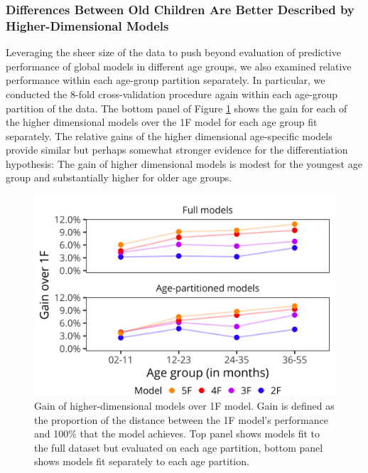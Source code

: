 \documentclass[man, floatsintext]{apa7}
\begin{document}
\subsubsection{Differences Between Old Children Are Better Described by
Higher-Dimensional
Models}

Leveraging the sheer size of the data to push beyond evaluation of predictive performance of global models in different age groups, we also examined relative performance within each age-group partition separately. In particular, we conducted the 8-fold cross-validation procedure again within each age-group partition of the data. The bottom panel of Figure \ref{fig:study1} shows the gain for
each of the higher dimensional models over the 1F model for each age
group fit separately. The relative gains of the higher dimensional age-specific models provide similar but perhaps somewhat stronger evidence for the differentiation hypothesis: The gain of higher dimensional
models is modest for the youngest age group and substantially higher for
older age groups.

\begin{figure}[t]
\centering
\includegraphics[width=5in]{figures/study1.png}
\caption{Gain of higher-dimensional models over 1F model. Gain is defined as the proportion of the distance between the 1F model’s performance and 100\% that the model achieves. Top panel shows models fit to the full dataset but evaluated on each age partition, bottom panel shows models fit separately to each age partition.
}
\label{fig:study1}
\end{figure}
\end{document}

